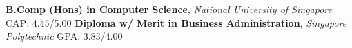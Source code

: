 %
%
%


\begin{education}
					{\textbf{B.Comp (Hons) in Computer Science}, \textit{National University of Singapore}}
	\educationentry{} {CAP: 4.45/5.00}
					{\textbf{Diploma w/ Merit in Business Administration}, \textit{Singapore Polytechnic}}
	\educationentry{} {GPA: 3.83/4.00}
\end{education}
